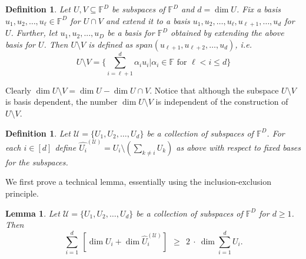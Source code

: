 \documentclass[10pt,a4paper]{article}
\newtheorem{definition}[theorem]{Definition}
\newtheorem{lemma}[theorem]{Lemma}
\newcommand{\F}{\mathbb{F}}
\begin{document}
\begin{definition}\label{def-setminus}
Let $U, V \subseteq \F^D$ be subspaces of $\F^D$ and $d= \dim U$. Fix
a basis $u_1, u_2, \ldots, u_\ell \in \F^D$ for $U \cap V$ and extend
it to a basis $u_1, u_2, \ldots, u_\ell, u_{\ell+1}, \ldots, u_d$ for
$U$. Further, let $u_1, u_2, ..., u_D$ be a basis for $\F^D$ obtained
by extending the above basis for $U$. Then $U\setminus V$ is defined
as $span(u_{\ell+1}, u_{\ell+2}, \ldots, u_d)$, i.e.
\[
U\setminus V = \{ \sum_{i= \ell+1}^{d} \alpha_i u_i | \alpha_i \in \mathbb{F} \textrm{ for } \ell < i \leq d \} 
\]
\end{definition}

Clearly $\dim U\setminus V = \dim U - \dim U \cap V$. Notice that
although the subspace $U\setminus V$ is basis dependent, the number
$\dim U\setminus V$ is independent of the construction of $U\setminus
V$.

\begin{definition}\label{projection}
Let $\mathcal{U}=\{U_1, U_2, \ldots, U_d \}$ be a collection of
subspaces of $\mathbb{F}^{D}$. For each $i \in [d]$ define
$\hat{U_i}^{(\mathcal{U})} = U_i \setminus (\sum_{k \neq i} U_k)$ as
above with respect to fixed bases for the subspaces.
\end{definition}

We first prove a technical lemma, essentially using the
inclusion-exclusion principle.

\begin{lemma}\label{hkv-rank-lemma}
Let $\mathcal{U}= \{U_1, U_2, \ldots, U_d\}$ be a collection of
subspaces of $\mathbb{F}^D$ for $d\geq 1$. Then
\[
\sum_{i=1}^{d}~ \left[\dim U_i + \dim \hat{U}_i^{(\mathcal{U})}
  \right]~~ \geq ~~2~\cdot~\dim \sum_{i=1}^d U_i.
\]
\end{lemma}
\end{document}
